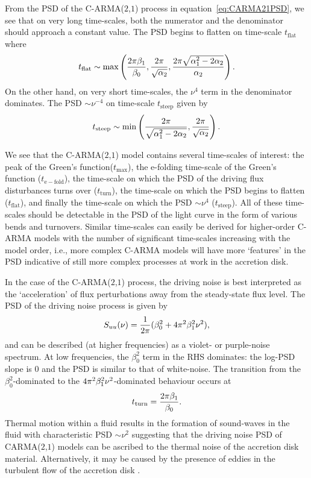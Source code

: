 \documentclass[a4paper,fleqn,usenatbib]{mnras}
\begin{document}
From the PSD of the C-ARMA($2$,$1$) process in equation~\eqref{eq:CARMA21PSD}, we see that on very long time-scales, both the numerator and the denominator should approach a constant value. The PSD begins to flatten on time-scale $t_{\mathrm{flat}}$ where
\begin{equation}\label{eq:TFLAT}
t_{\mathrm{flat}} \sim \max \left( \frac{2\pi \beta_{1}}{\beta_{0}},\frac{2\pi}{\sqrt{\alpha_{2}}},\frac{2\pi \sqrt{\alpha_{1}^{2}-2\alpha_{2}}}{\alpha_{2}} \right).
\end{equation}
On the other hand, on very short time-scales, the $\nu^{4}$ term in the denominator dominates. The PSD $\sim \nu^{-4}$ on time-scale $t_{\mathrm{steep}}$ given by
\begin{equation}\label{eq:STEEP}
t_{\mathrm{steep}} \sim \min \left( \frac{2\pi}{\sqrt{\alpha_{1}^{2} - 2\alpha_{2}}}, \frac{2\pi}{\sqrt{\alpha_{2}}}  \right).
\end{equation}

We see that the C-ARMA($2$,$1$) model contains several time-scales of interest: the peak of the Green's function($t_{\mathrm{max}}$), the e-folding time-scale of the Green's function ($t_{\mathrm{e-fold}}$), the time-scale on which the PSD of the driving flux disturbances turns over ($t_{\mathrm{turn}}$), the time-scale on which the PSD begins to flatten ($t_{\mathrm{flat}}$), and finally the time-scale on which the PSD $\sim \nu^{4}$ ($t_{\mathrm{steep}}$). All of these time-scales should be detectable in the PSD of the light curve in the form of various bends and turnovers. Similar time-scales can easily be derived for higher-order C-ARMA models with the number of significant time-scales increasing with the model order, i.e., more complex C-ARMA models will have more `features' in the PSD indicative of still more complex processes at work in the accretion disk.

In the case of the C-ARMA($2$,$1$) process, the driving noise is best interpreted as the `acceleration' of flux perturbations away from the steady-state flux level. The PSD of the driving noise process is given by
\begin{equation}\label{eq:CARMA21distPSD}
S_{uu}(\nu) = \frac{1}{2 \pi}(\beta_{0}^{2} + 4 \pi^{2} \beta_{1}^{2} \nu^{2}),
\end{equation}
and can be described (at higher frequencies) as a violet- or purple-noise spectrum. At low frequencies, the $\beta_{0}^{2}$ term in the RHS dominates: the log-PSD slope is $0$ and the PSD is similar to that of white-noise. The transition from the $\beta_{0}^{2}$-dominated to the $4 \pi^{2} \beta_{1}^{2} \nu^{2}$-dominated behaviour occurs at
\begin{equation}\label{eq:distPSDTurnover}
t_{\mathrm{turn}} = \frac{2 \pi \beta_{1}}{\beta_{0}}.
\end{equation}
Thermal motion within a fluid results in the formation of sound-waves in the fluid with characteristic PSD $\sim \nu^{{2}}$ \citep{Mellen52} suggesting that the driving noise PSD of CARMA($2$,$1$) models can be ascribed to the thermal noise of the accretion disk material. Alternatively, it may be caused by the presence of eddies in the turbulent flow of the accretion disk \citep{EddySim15}.
\end{document}
